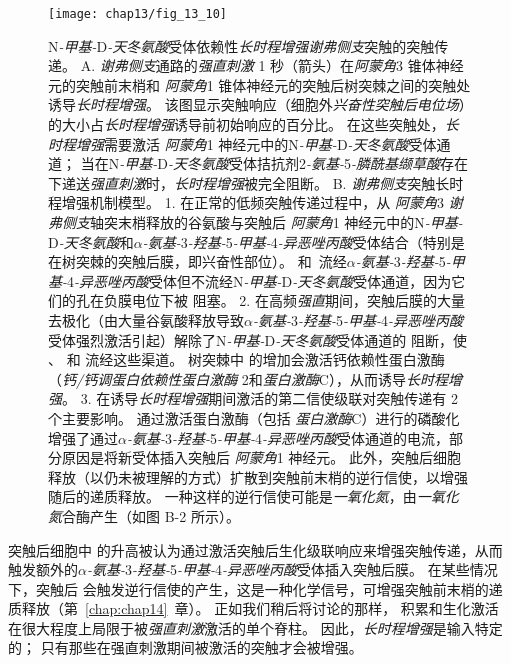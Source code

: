\begin{figure}[htbp]
	\centering
	\texttt{[image: chap13/fig\_13\_10]}
	\caption{N\textit{-甲基-}D\textit{-天冬氨酸}受体依赖性\textit{长时程增强}\textit{谢弗侧支}突触的突触传递。
		A. \textit{谢弗侧支}通路的\textit{强直刺激} 1 秒（箭头）在\textit{阿蒙角}3 锥体神经元的突触前末梢和 \textit{阿蒙角}1 锥体神经元的突触后树突棘之间的突触处诱导\textit{长时程增强}。
		该图显示突触响应（细胞外\textit{兴奋性突触后电位场}）的大小占\textit{长时程增强}诱导前初始响应的百分比。
		在这些突触处，\textit{长时程增强}需要激活 \textit{阿蒙角}1 神经元中的N\textit{-甲基-}D\textit{-天冬氨酸}受体通道； 
		当在N\textit{-甲基-}D\textit{-天冬氨酸}受体拮抗剂2\textit{-氨基-}5\textit{-膦酰基缬草酸}存在下递送\textit{强直刺激}时，\textit{长时程增强}被完全阻断\cite{morgan2001electrical}。
		B. \textit{谢弗侧支}突触长时程增强机制模型。
		1. 在正常的低频突触传递过程中，从 \textit{阿蒙角}3 \textit{谢弗侧支}轴突末梢释放的谷氨酸与突触后 \textit{阿蒙角}1 神经元中的N\textit{-甲基-}D\textit{-天冬氨酸}和\textit{$\alpha$-氨基-}3\textit{-羟基-}5\textit{-甲基-}4\textit{-异恶唑丙酸}受体结合（特别是在树突棘的突触后膜，即兴奋性部位）。
		和~流经\textit{$\alpha$-氨基-}3\textit{-羟基-}5\textit{-甲基-}4\textit{-异恶唑丙酸}受体但不流经N\textit{-甲基-}D\textit{-天冬氨酸}受体通道，因为它们的孔在负膜电位下被  阻塞。
		2. 在高频\textit{强直}期间，突触后膜的大量去极化（由大量谷氨酸释放导致\textit{$\alpha$-氨基-}3\textit{-羟基-}5\textit{-甲基-}4\textit{-异恶唑丙酸}受体强烈激活引起）解除了N\textit{-甲基-}D\textit{-天冬氨酸}受体通道的  阻断，使 、 和  流经这些渠道。
		树突棘中  的增加会激活钙依赖性蛋白激酶（\textit{钙/钙调蛋白依赖性蛋白激酶} 2和\textit{蛋白激酶}C），从而诱导\textit{长时程增强}。
		3. 在诱导\textit{长时程增强}期间激活的第二信使级联对突触传递有 2 个主要影响。
		通过激活蛋白激酶（包括 \textit{蛋白激酶}C）进行的磷酸化增强了通过\textit{$\alpha$-氨基-}3\textit{-羟基-}5\textit{-甲基-}4\textit{-异恶唑丙酸}受体通道的电流，部分原因是将新受体插入突触后 \textit{阿蒙角}1 神经元。
		此外，突触后细胞释放（以仍未被理解的方式）扩散到突触前末梢的逆行信使，以增强随后的递质释放。
		一种这样的逆行信使可能是\textit{一氧化氮}，由\textit{一氧化氮}合酶产生（如图 B-2 所示）。}
	\label{fig:13_10}
\end{figure}


突触后细胞中  的升高被认为通过激活突触后生化级联响应来增强突触传递，从而触发额外的\textit{$\alpha$-氨基-}3\textit{-羟基-}5\textit{-甲基-}4\textit{-异恶唑丙酸}受体插入突触后膜。
在某些情况下，突触后  会触发逆行信使的产生，这是一种化学信号，可增强突触前末梢的递质释放（第~\ref{chap:chap14}~章）。
正如我们稍后将讨论的那样， 积累和生化激活在很大程度上局限于被\textit{强直刺激}激活的单个脊柱。
因此，\textit{长时程增强}是输入特定的；
只有那些在强直刺激期间被激活的突触才会被增强。


